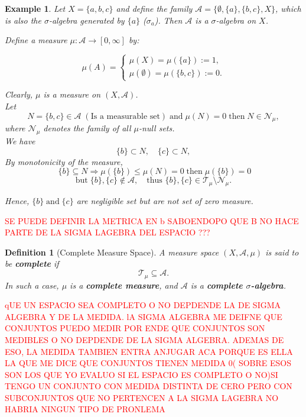 \documentclass[10pt, oneside]{article}
\newenvironment{definitionbox}[1][]{\begin{defbox}\begin{defn}[#1]}{\end{defn}\end{defbox}}
\numberwithin{equation}{section}
\newtheorem{defn}{Definition}[section]
\newtheorem{example}[thm]{Example}
\begin{document}
\begin{example}\label{example:zero-measure}
Let \( X = \{a, b, c\} \) and define the family $\mathcal{A} = \{\emptyset, \{a\}, \{b,c\}, X\}$, which is also
the $\sigma$-algebra generated by $\{a\}$ ($\sigma_{a}$). 
Then \(\mathcal{A}\) is a \(\sigma\)-algebra on \(X\).

Define a measure \(\mu : \mathcal{A} \to [0, \infty]\) by:

\[
\mu(A) =
\begin{cases}
\mu(X) = \mu(\{a\}) := 1,\\[4pt]
\mu(\emptyset) = \mu(\{b,c\}) := 0.
\end{cases}
\]

Clearly, \(\mu\) is a measure on \((X, \mathcal{A})\).\\

Let
\[
N = \{b, c\} \in \mathcal{A} \; (\text{Is a measurable set}) \; \text{and} \; \mu(N)=0 \; \text{then} \; N \in \mathcal{N}_{\mu},
\]
where \(\mathcal{N}_{\mu}\) denotes the family of all \(\mu\)-null sets. \\

We have
\[
\{b\} \subset N, \quad \{c\} \subset N,
\]
\indent By monotonicity of the measure, 
\[
 \; \{b\} \subseteq N \Rightarrow \mu(\{b\}) \leq \mu(N) = 0 \; \text{then}\;\mu(\{b\})=0  
\]
\[
\text{but} \; \{b\}, \{c\} \notin \mathcal{A}, \quad \text{thus } \{b\}, \{c\} \in \mathcal{T}_\mu \setminus \mathcal{N}_\mu.
\]

Hence, \(\{b\} \; \text{and} \; \{c\} \) are negligible set but are not set of zero measure.

\end{example}
\textcolor{red}{SE PUEDE DEFINIR LA METRICA EN {b} SABOENDOPO QUE B NO HACE PARTE DE LA SIGMA LAGEBRA DEL ESPACIO ??? }


\begin{definitionbox}[Complete Measure Space]\label{def:complete-measurable-space}
A measure space \((X, \mathcal{A}, \mu)\) is said to be \textbf{complete} if
\[
\mathcal{T}_{\mu} \subseteq \mathcal{A}.
\]
In such a case, \(\mu\) is a \textbf{complete measure}, and \(\mathcal{A}\) is a \textbf{complete \(\sigma\)-algebra}.
\end{definitionbox}

\textcolor{red}{qUE UN ESPACIO SEA COMPLETO O NO DEPDENDE LA DE SIGMA ALGEBRA Y DE LA MEDIDA. lA SIGMA ALGEBRA ME DEIFNE QUE CONJUNTOS PUEDO MEDIR
POR ENDE QUE CONJUNTOS SON MEDIBLES O NO DEPDENDE DE LA SIGMA ALGEBRA. ADEMAS DE ESO, LA MEDIDA TAMBIEN ENTRA ANJUGAR ACA PORQUE ES ELLA LA QUE ME DICE 
QUE CONJUNTOS TIENEN MEDIDA 0( SOBRE ESOS SON LOS QUE YO EVALUO SI EL ESPACIO ES COMPLETO O NO)SI TENGO UN CONJUNTO CON MEDIDA DISTINTA DE CERO PERO CON 
SUBCONJUNTOS QUE NO PERTENCEN A LA SIGMA LAGEBRA NO HABRIA NINGUN TIPO DE PRONLEMA}
\end{document}
